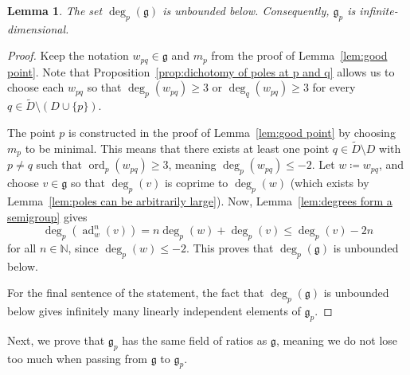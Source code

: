 \documentclass[12pt]{amsart}
\theoremstyle{plain}
\newtheorem{lemma}[theorem]{Lemma}
\theoremstyle{definition}
\numberwithin{equation}{section}
\def\g{\mathfrak{g}}
\def\NN{\mathbb{N}}
\DeclareMathOperator{\ord}{ord}
\DeclareMathOperator{\ad}{ad}
\begin{document}
\begin{lemma}\label{lem:g_p is infinite-dimensional}
    The set $\deg_p(\g)$ is unbounded below. Consequently, $\g_p$ is infinite-dimensional.
\end{lemma}
\begin{proof}
    Keep the notation $w_{pq} \in \g$ and $m_p$ from the proof of Lemma~\ref{lem:good point}. Note that Proposition~\ref{prop:dichotomy of poles at p and q} allows us to choose each $w_{pq}$ so that $\deg_p(w_{pq}) \geq 3$ or $\deg_q(w_{pq}) \geq 3$ for every $q \in \widetilde{D} \setminus (D \cup \{p\})$.
    
    The point $p$ is constructed in the proof of Lemma~\ref{lem:good point} by choosing $m_p$ to be minimal. This means that there exists at least one point $q \in \widetilde{D} \setminus D$ with $p \neq q$ such that $\ord_p(w_{pq}) \geq 3$, meaning $\deg_p(w_{pq}) \leq -2$. Let $w \coloneqq w_{pq}$, and choose $v \in \g$ so that $\deg_p(v)$ is coprime to $\deg_p(w)$ (which exists by Lemma~\ref{lem:poles can be arbitrarily large}). Now, Lemma~\ref{lem:degrees form a semigroup} gives
    $$\deg_p(\ad_w^n(v)) = n\deg_p(w) + \deg_p(v) \leq \deg_p(v) - 2n$$
    for all $n \in \NN$, since $\deg_p(w) \leq -2$. This proves that $\deg_p(\g)$ is unbounded below.
    
    For the final sentence of the statement, the fact that $\deg_p(\g)$ is unbounded below gives infinitely many linearly independent elements of $\g_p$.
\end{proof}

Next, we prove that $\g_p$ has the same field of ratios as $\g$, meaning we do not lose too much when passing from $\g$ to $\g_p$.
\end{document}
